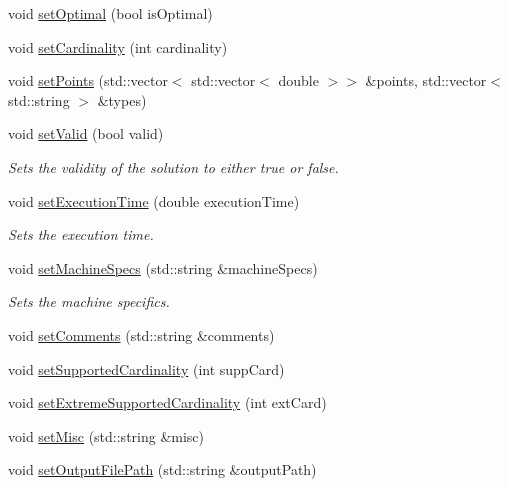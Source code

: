 \begin{DoxyCompactItemize}
void \hyperlink{class_m_orepo_result_writer_acfb0a96e01d3f5ed405d24f2ce0b1c3e}{set\+Optimal} (bool is\+Optimal)
\item 
void \hyperlink{class_m_orepo_result_writer_af1c8ffb740f29485e1132d65935ab9a1}{set\+Cardinality} (int cardinality)
\item 
void \hyperlink{class_m_orepo_result_writer_aca99e0483a9af6c31557f678917b5ee3}{set\+Points} (std\+::vector$<$ std\+::vector$<$ double $>$$>$ \&points, std\+::vector$<$ std\+::string $>$ \&types)
\item 
void \hyperlink{class_m_orepo_result_writer_aaf7016f6cb3b0f2712c09a8394d0f91a}{set\+Valid} (bool valid)
\begin{DoxyCompactList}\small\item\em Sets the validity of the solution to either true or false. \end{DoxyCompactList}\item 
void \hyperlink{class_m_orepo_result_writer_a25d3f1385b1062e5ff94e02019033df7}{set\+Execution\+Time} (double execution\+Time)
\begin{DoxyCompactList}\small\item\em Sets the execution time. \end{DoxyCompactList}\item 
void \hyperlink{class_m_orepo_result_writer_a8fbabd8b91249fa93119c45075d7b478}{set\+Machine\+Specs} (std\+::string \&machine\+Specs)
\begin{DoxyCompactList}\small\item\em Sets the machine specifics. \end{DoxyCompactList}\item 
void \hyperlink{class_m_orepo_result_writer_ad88bdad7c191a3ac3db5456fc03cf1e6}{set\+Comments} (std\+::string \&comments)
\item 
void \hyperlink{class_m_orepo_result_writer_aa7392328b02fd0e1c9edcbb16e4d47df}{set\+Supported\+Cardinality} (int supp\+Card)
\item 
void \hyperlink{class_m_orepo_result_writer_a5d8fb239afcead1e6eb3fef1b0313ca0}{set\+Extreme\+Supported\+Cardinality} (int ext\+Card)
\item 
void \hyperlink{class_m_orepo_result_writer_a4b96d6797c67055383c8692c9d907dd9}{set\+Misc} (std\+::string \&misc)
\item 
void \hyperlink{class_m_orepo_result_writer_a9ceed0e69181fb4352084c53d233743c}{set\+Output\+File\+Path} (std\+::string \&output\+Path)
\end{DoxyCompactItemize}


